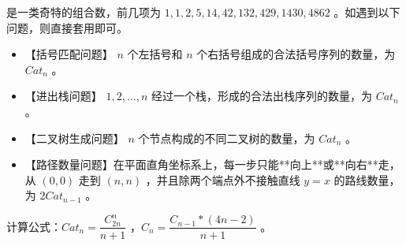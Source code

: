 是一类奇特的组合数，前几项为 $1,1,2,5,14,42,132,429,1430,4862$ 。如遇到以下问题，则直接套用即可。

\begin{itemize}
    \item 【括号匹配问题】 $n$ 个左括号和 $n$ 个右括号组成的合法括号序列的数量，为 $Cat_n$ 。
    \item 【进出栈问题】 $1,2,…,n$ 经过一个栈，形成的合法出栈序列的数量，为 $Cat_n$ 。
    \item 【二叉树生成问题】 $n$ 个节点构成的不同二叉树的数量，为 $Cat_n$ 。
    \item 【路径数量问题】在平面直角坐标系上，每一步只能**向上**或**向右**走，从 $(0,0)$ 走到 $(n,n)$ ，并且除两个端点外不接触直线 $y=x$ 的路线数量，为 $2Cat_{n-1}$ 。
\end{itemize}

计算公式：$Cat_n=\dfrac{C^n_{2n}}{n+1}$ ，$C_n=\dfrac{C_{n-1}*(4n-2)}{n+1}$ 。